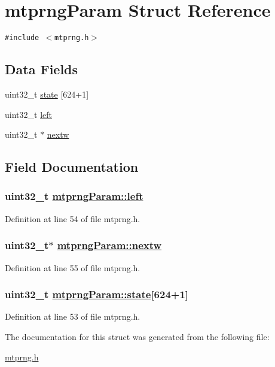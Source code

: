 \hypertarget{structmtprngParam}{
\section{mtprng\-Param Struct Reference}
\label{structmtprngParam}
}
{\tt \#include $<$mtprng.h$>$}

\subsection*{Data Fields}
\begin{CompactItemize}
\item 
uint32\_\-t \hyperlink{structmtprngParam_o0}{state} \mbox{[}624+1\mbox{]}
\item 
uint32\_\-t \hyperlink{structmtprngParam_o1}{left}
\item 
uint32\_\-t $\ast$ \hyperlink{structmtprngParam_o2}{nextw}
\end{CompactItemize}


\subsection{Field Documentation}
\hypertarget{structmtprngParam_o1}{
\subsubsection[left]{\setlength{\rightskip}{0pt plus 5cm}uint32\_\-t \hyperlink{structmtprngParam_o1}{mtprng\-Param::left}}}
\label{structmtprngParam_o1}


Definition at line 54 of file mtprng.h.\hypertarget{structmtprngParam_o2}{
\subsubsection[nextw]{\setlength{\rightskip}{0pt plus 5cm}uint32\_\-t$\ast$ \hyperlink{structmtprngParam_o2}{mtprng\-Param::nextw}}}
\label{structmtprngParam_o2}


Definition at line 55 of file mtprng.h.\hypertarget{structmtprngParam_o0}{
\subsubsection[state]{\setlength{\rightskip}{0pt plus 5cm}uint32\_\-t \hyperlink{structmtprngParam_o0}{mtprng\-Param::state}\mbox{[}624+1\mbox{]}}}
\label{structmtprngParam_o0}


Definition at line 53 of file mtprng.h.

The documentation for this struct was generated from the following file:\begin{CompactItemize}
\item 
\hyperlink{mtprng_8h}{mtprng.h}\end{CompactItemize}
